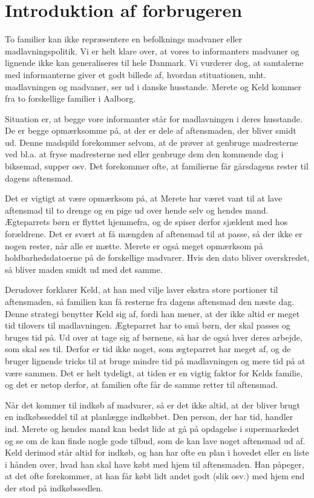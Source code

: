 \section{Introduktion af forbrugeren}
\label{sec:introduktionafforbrugeren}

To familier kan ikke repræsentere en befolknings madvaner eller madlavningspolitik. Vi er helt klare over, at vores to informanters madvaner og lignende ikke kan generaliseres til hele Danmark. Vi vurderer dog, at samtalerne med informanterne giver et godt billede af, hvordan stituationen, mht. madlavningen og madvaner, ser ud i danske husstande. Merete og Keld kommer fra to forskellige familier i Aalborg.

Situation er, at begge vore informanter står for madlavningen i deres husstande. De er begge opmærksomme på, at der er dele af aftensmaden, der bliver smidt ud. Denne madspild forekommer selvom, at de prøver at genbruge madresterne ved bl.a. at fryse madresterne ned eller genbruge dem den kommende dag i \fx biksemad, supper osv. Det forekommer ofte, at familierne får gårsdagens rester til dagens aftensmad.

Det er vigtigt at være opmærksom på, at Merete har været vant til at lave aftensmad til to drenge og en pige ud over hende selv og hendes mand. Ægteparrets børn er flyttet hjemmefra, og de spiser derfor sjældent med hos forældrene. Det er svært at få mængden af aftensmad til at passe, så der ikke er nogen rester, når alle er mætte. Merete er også meget opmærksom på holdbarhedsdatoerne på de forskellige madvarer. Hvis den dato bliver overskredet, så bliver maden smidt ud med det samme.

Derudover forklarer Keld, at han med vilje laver ekstra store portioner til aftensmaden, så familien kan få resterne fra dagens aftensmad den næste dag. Denne strategi benytter Keld sig af, fordi han mener, at der ikke altid er meget tid tilovers til madlavningen. Ægteparret har to små børn, der skal passes og bruges tid på. Ud over at tage sig af børnene, så har de også hver deres arbejde, som skal ses til. Derfor er tid ikke noget, som ægteparret har meget af, og de bruger lignende tricks til at bruge mindre tid på madlavningen og mere tid på at være sammen. Det er helt tydeligt, at tiden er en vigtig faktor for Kelds familie, og det er netop derfor, at familien ofte får de samme retter til aftensmad.

Når det kommer til indkøb af madvarer, så er det ikke altid, at der bliver brugt en indkøbsseddel til at planlægge indkøbbet. Den person, der har tid, handler ind. Merete og hendes mand kan bedst lide at gå på opdagelse i supermarkedet og se om de kan finde nogle gode tilbud, som de kan lave noget aftensmad ud af. Keld derimod står altid for indkøb, og han har ofte en plan i hovedet eller en liste i hånden over, hvad han skal have købt med hjem til aftensmaden. Han påpeger, at det ofte forekommer, at han får købt lidt andet godt (slik osv.) med hjem end der stod på indkøbssedlen.

